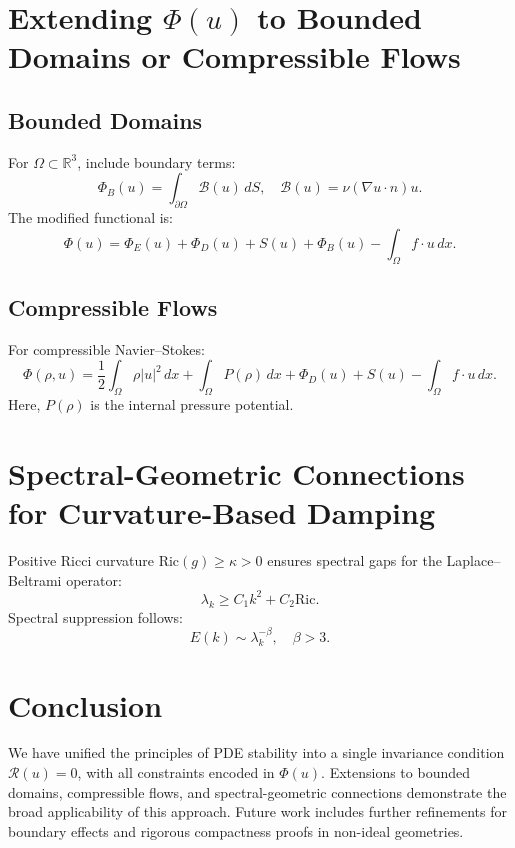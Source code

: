 \section{Extending \(\Phi(u)\) to Bounded Domains or Compressible Flows}

\subsection{Bounded Domains}
For \(\Omega \subset \mathbb{R}^3\), include boundary terms:
\begin{equation}
\Phi_B(u) = \int_{\partial \Omega} \mathcal{B}(u) \, dS, \quad \mathcal{B}(u) = \nu (\nabla u \cdot n) u.
\end{equation}
The modified functional is:
\begin{equation}
\Phi(u) = \Phi_E(u) + \Phi_D(u) + S(u) + \Phi_B(u) - \int_\Omega f \cdot u \, dx.
\end{equation}

\subsection{Compressible Flows}
For compressible Navier--Stokes:
\begin{equation}
\Phi(\rho, u) = \frac{1}{2} \int_\Omega \rho |u|^2 \, dx + \int_\Omega P(\rho) \, dx + \Phi_D(u) + S(u) - \int_\Omega f \cdot u \, dx.
\end{equation}
Here, \(P(\rho)\) is the internal pressure potential.

\section{Spectral-Geometric Connections for Curvature-Based Damping}

Positive Ricci curvature \(\text{Ric}(g) \geq \kappa > 0\) ensures spectral gaps for the Laplace--Beltrami operator:
\begin{equation}
\lambda_k \geq C_1 k^2 + C_2 \text{Ric}.
\end{equation}
Spectral suppression follows:
\begin{equation}
E(k) \sim \lambda_k^{-\beta}, \quad \beta > 3.
\end{equation}

\section{Conclusion}
We have unified the principles of PDE stability into a single invariance condition \(\mathcal{R}(u) = 0\), with all constraints encoded in \(\Phi(u)\). Extensions to bounded domains, compressible flows, and spectral-geometric connections demonstrate the broad applicability of this approach. Future work includes further refinements for boundary effects and rigorous compactness proofs in non-ideal geometries.

